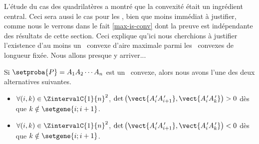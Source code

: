 L'étude du cas des quadrilatères a montré que la convexité était un ingrédient central. Ceci sera aussi le cas pour les \ngones, bien que moins immédiat à justifier, comme nous le verrons dans le fait \ref{max-is-conv} dont la preuve est indépendante des résultats de cette section.
%
Ceci explique qu'ici nous cherchions à justifier l'existence d'au moins un \ngone\ convexe d'aire maximale parmi les \ngones\ convexes de longueur fixée. Nous allons presque y arriver...




\begin{fact}
    Si $\setproba{P} = A_1 A_2 \cdots A_n$ est un \ngone\ convexe, alors nous avons l'une des deux alternatives suivantes.
	\begin{itemize}
		\item $\forall (i, k) \in \ZintervalC{1}{n}^2$,
		$\det \big( \vect{A^{\,\prime}_i A^{\,\prime}_{i+1}}, \vect{A^{\,\prime}_i A^{\,\prime}_k} \big) > 0$
		dès que $k \notin \setgene{i ; i+1}$.

		\item $\forall (i, k) \in \ZintervalC{1}{n}^2$,
		$\det \big( \vect{A^{\,\prime}_i A^{\,\prime}_{i+1}}, \vect{A^{\,\prime}_i A^{\,\prime}_k} \big) < 0$
		dès que $k \notin \setgene{i ; i+1}$.
    \end{itemize}
\end{fact}


